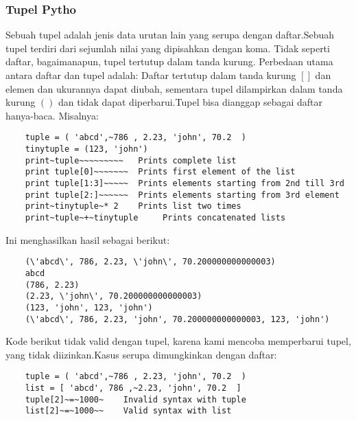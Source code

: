 \subsubsection{Tupel Pytho}
	Sebuah tupel adalah jenis data urutan lain yang serupa dengan daftar.Sebuah tupel terdiri dari sejumlah nilai yang dipisahkan dengan koma. Tidak seperti daftar, bagaimanapun, tupel tertutup dalam tanda kurung. 
Perbedaan utama antara daftar dan tupel adalah: Daftar tertutup dalam tanda kurung \([]\) dan elemen dan ukurannya dapat diubah, sementara tupel dilampirkan dalam tanda kurung \(()\) dan tidak dapat diperbarui.Tupel bisa dianggap sebagai daftar hanya-baca. 
Misalnya:
\begin{verbatim}
	tuple = ( 'abcd',~786 , 2.23, 'john', 70.2  ) 
	tinytuple = (123, 'john') 
	print~tuple~~~~~~~~~   Prints complete list
	print tuple[0]~~~~~~~  Prints first element of the list 
	print tuple[1:3]~~~~~  Prints elements starting from 2nd till 3rd  
	print tuple[2:]~~~~~~  Prints elements starting from 3rd element 
	print~tinytuple~* 2    Prints list two times 
	print~tuple~+~tinytuple     Prints concatenated lists 
\end{verbatim}
Ini menghasilkan hasil sebagai berikut:
\begin{verbatim}
	(\'abcd\', 786, 2.23, \'john\', 70.200000000000003) 
	abcd  
	(786, 2.23) 
	(2.23, \'john\', 70.200000000000003) 
	(123, 'john', 123, 'john') 
	(\'abcd\', 786, 2.23, 'john', 70.200000000000003, 123, 'john')
\end{verbatim}
Kode berikut tidak valid dengan tupel, karena kami mencoba memperbarui tupel, yang tidak diizinkan.Kasus serupa dimungkinkan dengan daftar:
\begin{verbatim}
	tuple = ( 'abcd',~786 , 2.23, 'john', 70.2  ) 
	list = [ 'abcd', 786 ,~2.23, 'john', 70.2  ] 
	tuple[2]~=~1000~    Invalid syntax with tuple 
	list[2]~=~1000~~    Valid syntax with list 
\end{verbatim}

